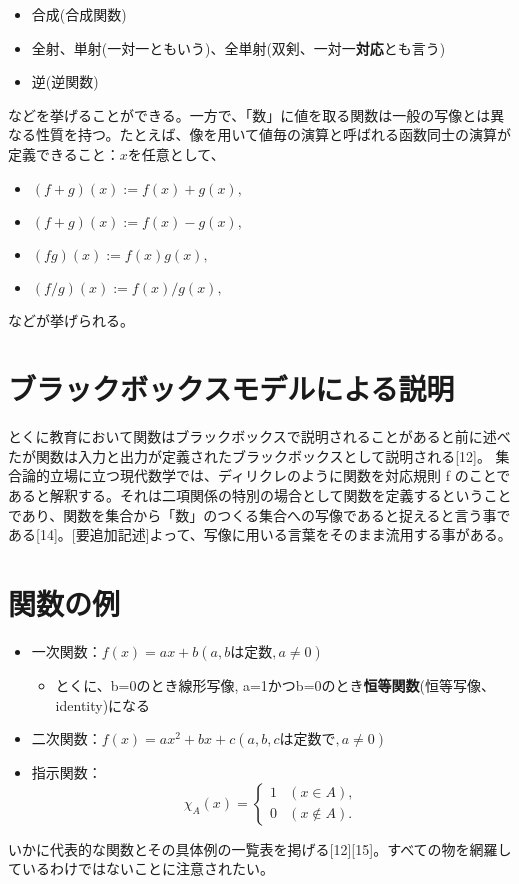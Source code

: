\documentclass[a4j,12pt]{jreport}
\begin{document}
\begin{itemize}
\item 合成(合成関数)
\item 全射、単射(一対一ともいう)、全単射(双剣、一対一{\bf 対応}とも言う)
\item 逆(逆関数)
\end{itemize}
などを挙げることができる。一方で、「数」に値を取る関数は一般の写像とは異なる性質を持つ。たとえば、像を用いて値毎の演算と呼ばれる函数同士の演算が定義できること：$x$を任意として、

\begin{itemize}
\item $(f + g)(x) := f(x) + g(x),$
\item $(f + g)(x) := f(x) - g(x),$
\item $(fg)(x) := f(x)g(x),$
\item $(f/g)(x) := f(x)/g(x),$
\end{itemize}

などが挙げられる。
\chapter{ブラックボックスモデルによる説明}
とくに教育において関数はブラックボックスで説明されることがあると前に述べたが関数は入力と出力が定義されたブラックボックスとして説明される[12]。
集合論的立場に立つ現代数学では、ディリクレのように関数を対応規則 f のことであると解釈する。それは二項関係の特別の場合として関数を定義するということであり、関数を集合から「数」のつくる集合への写像であると捉えると言う事である[14]。[要追加記述]よって、写像に用いる言葉をそのまま流用する事がある。


\chapter{関数の例}
\begin{itemize}
 \item 一次関数：$f(x) = ax + b( a,bは定数, a ≠ 0 )$
 \begin{itemize}
  \item とくに、b=0のとき線形写像, a=1かつb=0のとき{\bf 恒等関数}(恒等写像、identity)になる
 \end{itemize}
 \item 二次関数：$f(x) = ax^2 + bx+c( a,b,cは定数で, a ≠ 0 )$
 \item 指示関数：
\begin{equation}
\chi_A (x) = \begin{cases}
  1 & (x \in A), \\
  0 & (x \notin A).
  \end{cases}
\end{equation}
\end{itemize}
いかに代表的な関数とその具体例の一覧表を掲げる[12][15]。すべての物を網羅しているわけではないことに注意されたい。
\end{document}
